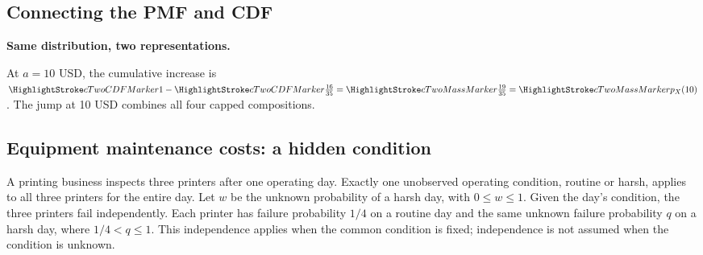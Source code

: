 \subsection*{Connecting the PMF and CDF}
\textbf{Same distribution, two representations.}
\begin{center}\end{center}
\cTwoConnectionReading
\par\smallskip At $a=10$ USD, the cumulative increase is $\cTwoCDFHL{1}-\cTwoCDFHL{\frac{16}{35}}=\cTwoMassHL{\frac{19}{35}}=\cTwoMassHL{p_X(10)}$. The jump at 10 USD combines all four capped compositions.
\ifGTenHighlights\else\par\vspace{3mm}\fi
{}


\clearpage
\subsection{Equipment maintenance costs: a hidden condition}\label{prob:maintenance}
A printing business inspects three printers after one operating day. Exactly one unobserved operating condition, routine or harsh, applies to all three printers for the entire day. Let $w$ be the unknown probability of a harsh day, with $0\leq w\leq1$. Given the day's condition, the three printers fail independently. Each printer has failure probability $1/4$ on a routine day and the same unknown failure probability $q$ on a harsh day, where $1/4<q\leq1$. This independence applies when the common condition is fixed; independence is not assumed when the condition is unknown.

